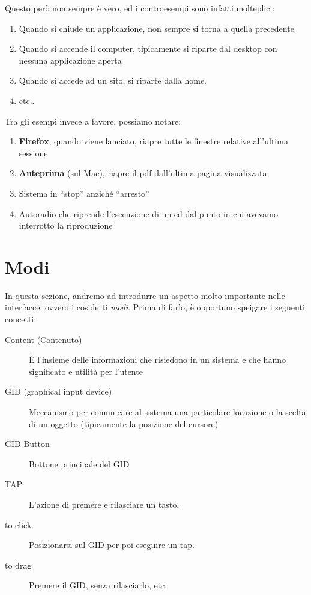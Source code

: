 \documentclass[oneside]{book}
\begin{document}
				Questo però non sempre è vero, ed i controesempi sono infatti molteplici:
				\begin{enumerate}
				\item Quando si chiude un applicazione, non sempre si torna a quella precedente
				\item Quando si accende il computer, tipicamente si riparte dal desktop con nessuna applicazione aperta
				\item Quando si accede ad un sito, si riparte dalla home.
				\item etc..
				\end{enumerate}
				Tra gli esempi invece a favore, possiamo notare:
				\begin{enumerate}
				\item \textbf{Firefox}, quando viene lanciato, riapre tutte le finestre relative all'ultima sessione
				\item \textbf{Anteprima} (sul Mac), riapre il pdf dall'ultima pagina visualizzata
				\item Sistema in ``stop'' anziché ``arresto''
				\item Autoradio che riprende l'esecuzione di un cd dal punto in cui avevamo interrotto la riproduzione
				\end{enumerate}

	\section{Modi}
		In questa sezione, andremo ad introdurre un aspetto molto importante nelle interfacce, ovvero i cosidetti \emph{modi}. Prima di farlo, è opportuno speigare i seguenti concetti:
		\begin{description}
		\item[Content (Contenuto)] È l'insieme delle informazioni che risiedono in un sistema e che hanno significato e utilità per l'utente
		\item[GID (graphical input device)] Meccanismo per comunicare al sistema una particolare locazione o la scelta di un oggetto (tipicamente la posizione del cursore)
		\item[GID Button] Bottone principale del GID
		\item[TAP] L'azione di premere e rilasciare un tasto.
		\item[to click] Posizionarsi sul GID per poi eseguire un tap.
		\item[to drag] Premere il GID, senza rilasciarlo, etc.
		\end{description}
\end{document}
